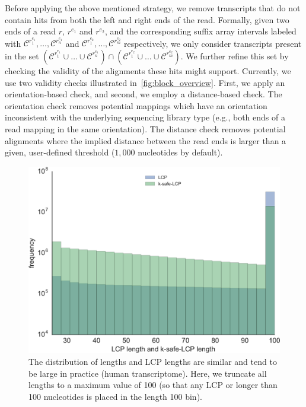Before applying the above mentioned strategy, we remove transcripts that do not contain hits from both the left 
and right ends of the read. Formally, given two ends of a read $r$, $r^{e_1}$ and $r^{e_2}$, and the corresponding 
suffix array intervals labeled with $\mathcal{C}^{r_1^{e_1}}, \ldots, \mathcal{C}^{r_n^{e_1}}$ and 
$\mathcal{C}^{r_1^{e_2}}, \ldots, \mathcal{C}^{r_m^{e_2}}$ respectively, we only consider transcripts present in 
the set $(\mathcal{C}^{r_1^{e_1}} \cup \ldots \cup \mathcal{C}^{r_n^{e_1}}) \cap (\mathcal{C}^{r_1^{e_2}} 
\cup \ldots \cup \mathcal{C}^{r_m^{e_2}})$.
We further refine this set by checking the validity of the alignments these hits might support. Currently, 
we use two validity checks illustrated in~\cref{fig:block_overview}. First, we apply an orientation-based 
check, and second, we employ a distance-based check. The orientation check removes potential mappings which have 
an orientation inconsistent with the underlying sequencing library type (e.g., both ends of a read mapping in the 
same orientation). The distance check removes potential alignments where the implied distance between the read 
ends is larger than a given, user-defined threshold ($1,000$ nucleotides by default).

\begin{figure}
 \centering
 \includegraphics[scale=0.40]{Figures/sla/dist_safelength-color}
 \caption[The distribution of \kslcp lengths and LCP lengths]{The distribution of \kslcp lengths and LCP lengths 
 are similar and tend to be large in practice (human transcriptome).  Here, we truncate all lengths to a maximum 
 value of 100 (so that any LCP or \kslcp longer than 100 nucleotides is placed in the length 100 bin).}
\label{fig:dist}
\end{figure}

